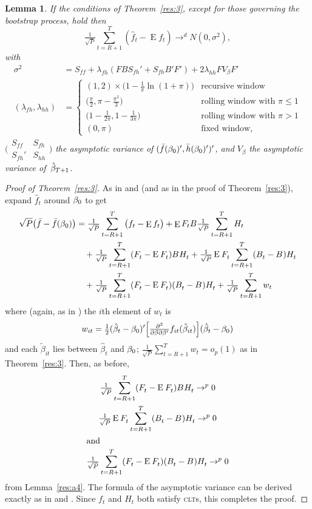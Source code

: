 \documentclass[11pt,fleqn]{article}
\newtheorem{lema}{Lemma}[section]
\theoremstyle{definition}
\DeclareMathOperator{\E}{E}
\newcommand{\btrue}[1][]{\if#1*\hat\beta_{T+1}\else\beta_0\fi}
\newcommand{\osum}[1]{\sum_{#1=R+1}^T}
\newcommand{\oclt}[1]{\tfrac{1}{\sqrt{P}} \osum{#1}}
\newcommand{\clt}{\textsc{clt}}
\begin{document}
\begin{lema}\label{res:a5}
  If the conditions of Theorem~\ref{res:3}, except for those governing
  the bootstrap process, hold then
  \begin{equation}
    \oclt{t}
    (\hat f_t - \E f_t) \to^d N(0, \sigma^2),
  \end{equation}
  with 
  \begin{align}
  \sigma^2 &= S_{ff} + \lambda_{fh} (F B S_{fh}' + S_{fh} B' F') + 2 \lambda_{hh} F V_\beta F' \\
  (\lambda_{fh}, \lambda_{hh}) &= 
  \begin{cases}
    (1, 2) \times \big(1 - \tfrac{1}{\pi} \ln(1 + \pi)\big) 
      & \text{recursive window} \\
    \big(\tfrac{\pi}{2}, \pi - \tfrac{\pi^2}{3}\big)
      & \text{rolling window with $\pi \leq 1$} \\
    \big(1 - \tfrac{1}{2\pi}, 1 - \tfrac{1}{3\pi}\big)
      & \text{rolling window with $\pi > 1$} \\
    (0, \pi) & \text{fixed window},
  \end{cases}
  \end{align}
  $\Big(\begin{smallmatrix}S_{ff} & S_{fh} \\ S_{fh}' &
    S_{hh} \end{smallmatrix} \Big)$ the asymptotic variance of $(\bar
  f(\btrue)', \bar h(\btrue)')'$, and $V_\beta$ the asymptotic
  variance of~$\btrue[*]$.
\end{lema}

\begin{proof}[Proof of Theorem~\ref{res:3}]
  As in \citet{Wes:96} and \citet{WeM:98} (and as in the proof of
  Theorem~\ref{res:3}), expand $\hat f_t$ around
  $\btrue$ to get
  \begin{align*}
    \sqrt{P} \big(\bar{f} - \bar{f}(\btrue)\big) &= \oclt{t}
    \big(f_t - \E f_t\big) +
    \E F_t B \oclt{t} H_t \\
    & \quad + \WesA + \WesB \\ & \quad + \WesC + \oclt{t} w_t
  \end{align*}
  where (again, as in \citealp{Wes:96}) the $i$th element of $w_t$ is
  \begin{equation*}
    w_{it} = \tfrac12 (\hat\beta_t - \btrue)'
    \Big[\tfrac{\partial^2}{\partial \beta \partial\beta'} 
    f_{it}(\tilde\beta_{it}) \Big]
    (\hat\beta_t - \btrue)
  \end{equation*}
  and each $\tilde\beta_{it}$ lies between $\hat\beta_t$ and
  $\btrue$; $\oclt{t} w_t = o_{p}(1)$ as in Theorem~\ref{res:3}.
  Then, as before,
  \begin{gather}
    \WesA \to^{p} 0 \label{eq:11} \\
    \WesB \to^{p} 0 \label{eq:12}\\
  \intertext{and}
    \WesC \to^{p} 0 \label{eq:13}
  \end{gather}
  from Lemma~\ref{res:a4}.  The formula of the asymptotic variance can
  be derived exactly as in \citet{Wes:96} and \citet{WeM:98}. Since
  $f_t$ and $H_t$ both satisfy \clt s, this completes the
  proof.
\end{proof}


\end{document}
